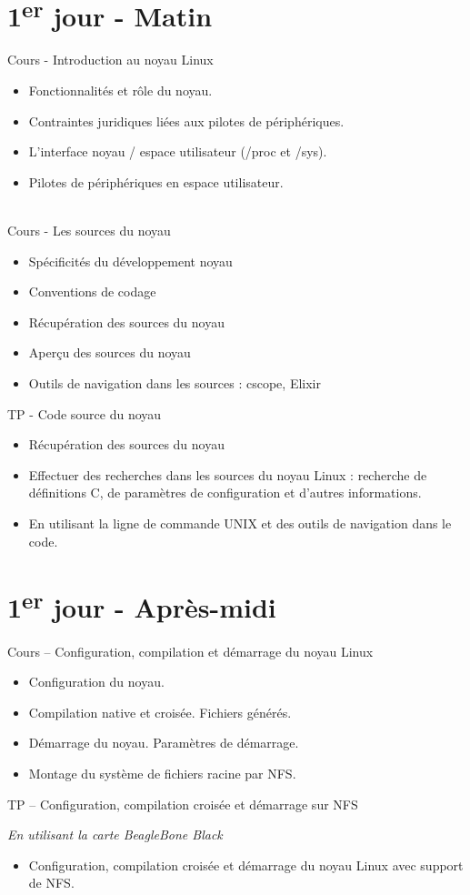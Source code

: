 \documentclass[a4paper,12pt,obeyspaces,spaces,hyphens]{article}
\begin{document}
\section{1\textsuperscript{er} jour - Matin}

\feagendaonecolumn
{Cours - Introduction au noyau Linux}
{
  \begin{itemize}
  \item Fonctionnalités et rôle du noyau.
  \item Contraintes juridiques liées aux pilotes de périphériques.
  \item L'interface noyau / espace utilisateur (/proc et /sys).
  \item Pilotes de périphériques en espace utilisateur.
  \end{itemize}
}
\\
\feagendatwocolumn
{Cours - Les sources du noyau}
{
  \begin{itemize}
  \item Spécificités du développement noyau
  \item Conventions de codage
  \item Récupération des sources du noyau
  \item Aperçu des sources du noyau
  \item Outils de navigation dans les sources : cscope, Elixir
  \end{itemize}
}
{TP - Code source du noyau}
{
  \begin{itemize}
  \item Récupération des sources du noyau
  \item Effectuer des recherches dans les sources du noyau Linux :
    recherche de définitions C, de paramètres de configuration et d'autres
    informations.
  \item En utilisant la ligne de commande UNIX et des outils de
    navigation dans le code.
 \end{itemize}
}

\section{1\textsuperscript{er} jour - Après-midi}
\feagendatwocolumn
{Cours – Configuration, compilation et démarrage du noyau Linux}
{
  \begin{itemize}
  \item Configuration du noyau.
  \item Compilation native et croisée. Fichiers générés.
  \item Démarrage du noyau. Paramètres de démarrage.
  \item Montage du système de fichiers racine par NFS.
  \end{itemize}
}
{TP – Configuration, compilation croisée et démarrage sur NFS}
{
  {\em En utilisant la carte BeagleBone Black}
  \begin{itemize}
  \item Configuration, compilation croisée et démarrage du noyau Linux
    avec support de NFS.
  \end{itemize}
}
\\
\end{document}
